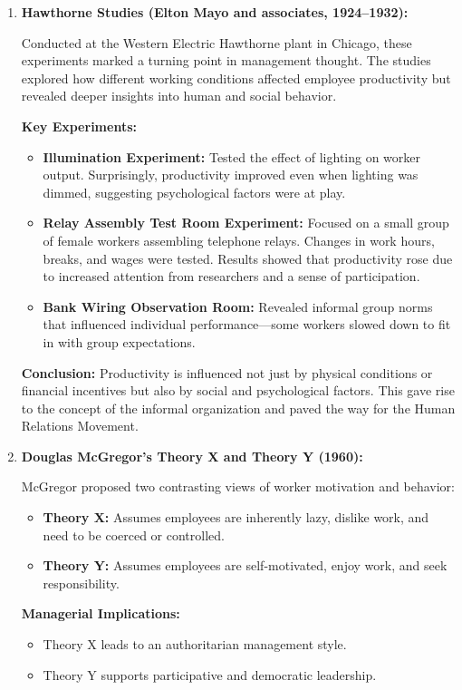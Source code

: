 \documentclass[10pt,a4paper]{book}
\begin{document}
\begin{multicols}{2}
\begin{enumerate}
    \item \textbf{Hawthorne Studies (Elton Mayo and associates, 1924–1932):}

    Conducted at the Western Electric Hawthorne plant in Chicago, these experiments marked a turning point in management thought. The studies explored how different working conditions affected employee productivity but revealed deeper insights into human and social behavior.

    \textbf{Key Experiments:}
    \begin{itemize}
        \item \textbf{Illumination Experiment:} Tested the effect of lighting on worker output. Surprisingly, productivity improved even when lighting was dimmed, suggesting psychological factors were at play.
        \item \textbf{Relay Assembly Test Room Experiment:} Focused on a small group of female workers assembling telephone relays. Changes in work hours, breaks, and wages were tested. Results showed that productivity rose due to increased attention from researchers and a sense of participation.
        \item \textbf{Bank Wiring Observation Room:} Revealed informal group norms that influenced individual performance—some workers slowed down to fit in with group expectations.
    \end{itemize}

    \textbf{Conclusion:} Productivity is influenced not just by physical conditions or financial incentives but also by social and psychological factors. This gave rise to the concept of the informal organization and paved the way for the Human Relations Movement.

    \item \textbf{Douglas McGregor's Theory X and Theory Y (1960):}

    McGregor proposed two contrasting views of worker motivation and behavior:

    \begin{itemize}
        \item \textbf{Theory X:} Assumes employees are inherently lazy, dislike work, and need to be coerced or controlled.
        \item \textbf{Theory Y:} Assumes employees are self-motivated, enjoy work, and seek responsibility.
    \end{itemize}

    \textbf{Managerial Implications:}
    \begin{itemize}
        \item Theory X leads to an authoritarian management style.
        \item Theory Y supports participative and democratic leadership.
    \end{itemize}


\end{enumerate}
\end{multicols}
\end{document}
